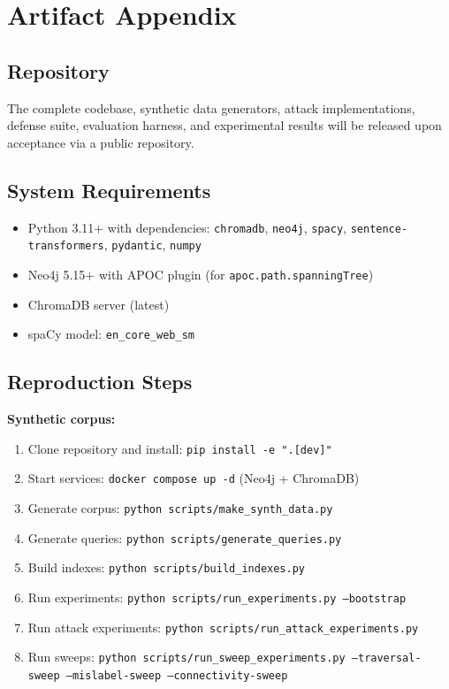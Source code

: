 \documentclass[letterpaper,twocolumn,10pt]{article}
\begin{document}
\section{Artifact Appendix}
\label{sec:artifact}

\subsection{Repository}

The complete codebase, synthetic data generators, attack
implementations, defense suite, evaluation harness, and experimental
results will be released upon acceptance via a public repository.

\subsection{System Requirements}

\begin{itemize}
\item Python 3.11+ with dependencies: \texttt{chromadb},
  \texttt{neo4j}, \texttt{spacy}, \texttt{sentence-transformers},
  \texttt{pydantic}, \texttt{numpy}
\item Neo4j 5.15+ with APOC plugin (for
  \texttt{apoc.path.spanningTree})
\item ChromaDB server (latest)
\item spaCy model: \texttt{en\_core\_web\_sm}
\end{itemize}

\subsection{Reproduction Steps}

\textbf{Synthetic corpus:}
\begin{enumerate}
\item Clone repository and install: \texttt{pip install -e ".[dev]"}
\item Start services: \texttt{docker compose up -d} (Neo4j + ChromaDB)
\item Generate corpus: \texttt{python scripts/make\_synth\_data.py}
\item Generate queries: \texttt{python scripts/generate\_queries.py}
\item Build indexes: \texttt{python scripts/build\_indexes.py}
\item Run experiments: \texttt{python scripts/run\_experiments.py
  --bootstrap}
\item Run attack experiments: \texttt{python
  scripts/run\_attack\_experiments.py}
\item Run sweeps: \texttt{python scripts/run\_sweep\_experiments.py
  --traversal-sweep --mislabel-sweep --connectivity-sweep}
\end{enumerate}
\end{document}

